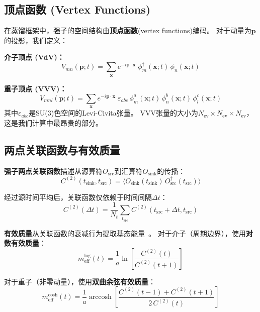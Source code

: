 \documentclass[11pt,a4paper]{article}
\newcommand{\meff}{m_{\mathrm{eff}}}
\newcommand{\Nev}{N_{\mathrm{ev}}}
\begin{document}
\subsection{顶点函数 (Vertex Functions)}

在蒸馏框架中，强子的空间结构由\textbf{顶点函数}(vertex functions)编码。
对于动量为$\bm{p}$的投影，我们定义：

\textbf{介子顶点 (VdV)：}
\begin{equation}
V_{mn}(\bm{p};t) = \sum_{\bm{x}} e^{-i\bm{p}\cdot\bm{x}}\;
\phi_m^{\dagger}(\bm{x};t)\,\phi_n(\bm{x};t)
\label{eq:VdV}
\end{equation}

\textbf{重子顶点 (VVV)：}
\begin{equation}
V_{mnl}(\bm{p};t) = \sum_{\bm{x}} e^{-i\bm{p}\cdot\bm{x}}\;
\varepsilon_{abc}\,\phi_m^{a}(\bm{x};t)\,\phi_n^{b}(\bm{x};t)\,\phi_l^{c}(\bm{x};t)
\label{eq:VVV}
\end{equation}
其中$\varepsilon_{abc}$是SU(3)色空间的Levi-Civita张量。
VVV张量的大小为$\Nev\times\Nev\times\Nev$，这是我们计算中最昂贵的部分。

\subsection{两点关联函数与有效质量}

\textbf{强子两点关联函数}描述从源算符$O_{\mathrm{src}}$到汇算符$O_{\mathrm{sink}}$的传播：
\begin{equation}
C^{(2)}(t_{\mathrm{sink}}, t_{\mathrm{src}})
= \langle O_{\mathrm{sink}}(t_{\mathrm{sink}})\, O_{\mathrm{src}}^{\dagger}(t_{\mathrm{src}}) \rangle
\end{equation}

经过源时间平均后，关联函数仅依赖于时间间隔$\Delta t$：
\begin{equation}
C^{(2)}(\Delta t) = \frac{1}{N_t}\sum_{t_{\mathrm{src}}}
C^{(2)}(t_{\mathrm{src}}+\Delta t, t_{\mathrm{src}})
\end{equation}

\textbf{有效质量}从关联函数的衰减行为提取基态能量~\cite{gattringer2010}。
对于介子（周期边界），使用\textbf{对数有效质量}：
\begin{equation}
\meff^{\mathrm{log}}(t) = \frac{1}{a}\ln\left[\frac{C^{(2)}(t)}{C^{(2)}(t+1)}\right]
\label{eq:meff_log}
\end{equation}

对于重子（非零动量），使用\textbf{双曲余弦有效质量}：
\begin{equation}
\meff^{\mathrm{cosh}}(t) = \frac{1}{a}\operatorname{arccosh}\left[
\frac{C^{(2)}(t-1)+C^{(2)}(t+1)}{2\,C^{(2)}(t)}\right]
\label{eq:meff_cosh}
\end{equation}
\end{document}
